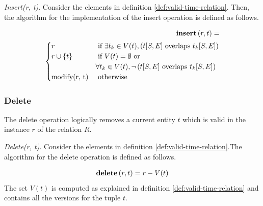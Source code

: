 \begin{definition}
 \emph{Insert(r, t)}.
Consider the elements in definition \ref{def:valid-time-relation}. Then, the algorithm for the implementation of the insert operation is defined as follows.
\end{definition}



\begin{align}
\label{eq:insert}
\INS \left(r, t\right) =\\
\begin{cases}
\nonumber
r & \mbox{ if }  \exists t_k \in V(t), \left(t[S,E] \mbox{ overlaps } t_k[S,E]\right)\\
\nonumber
r \cup \lbrace t \rbrace
& \mbox{ if }  V(t)=\emptyset \mbox{ or }\\
\nonumber & \forall t_k \in V(t), \lnot \left(t[S,E] \mbox{ overlaps } t_k[S,E]\right)\\
% 
\mbox{modify(r, t)} & \mbox{ otherwise }    %
\end{cases} 	
\end{align}

\subsubsection{\label{subsubsec:del}Delete}
The delete operation logically removes a current entity $t$ which is valid in the instance $r$ of the relation $R$.
\begin{definition}
 \emph{Delete(r, t)}.
Consider the elements in definition \ref{def:valid-time-relation}.The algorithm for the delete operation is defined as follows.
% 
\end{definition}


\begin{align}
\label{eq:delete}
\DEL \left(r, t\right) =
\nonumber
r - V(t)
% 
% 
\end{align}
The set $V(t)$ is computed as explained in definition \ref{def:valid-time-relation} and contains all the versions for the tuple $t$.


